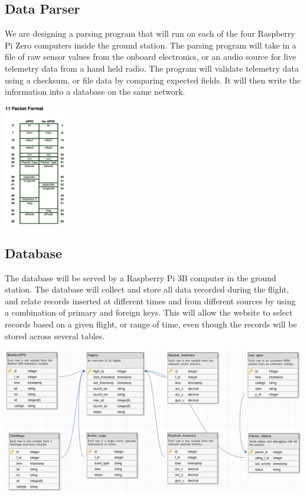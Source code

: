 \documentclass[onecolumn, draftclsnofoot, 10pt, compsoc]{IEEEtran}
\begin{document}
\subsection{Data Parser}
We are designing a parsing program that will run on each of the four Raspberry Pi Zero computers inside the ground station.  The parsing program will take in a file of raw sensor values from the onboard electronics, or an audio source for live telemetry data from a hand held radio.  The program will validate telemetry data using a checksum, or file data by comparing expected fields.  It will then write the information into a database on the same network.

\begin{center}
	\includegraphics[width=0.2\textwidth]{images/beelinegps-packet-format.eps}
    \label{parser-diagram}
\end{center}

\subsection{Database}
The database will be served by a Raspberry Pi 3B computer in the ground station.  The database will collect and store all data recorded during the flight, and relate records inserted at different times and from different sources by using a combination of primary and foreign keys. This will allow the website to select records based on a given flight, or range of time, even though the records will be stored across several tables.

\begin{center}
	\includegraphics[width=\textwidth]{images/database_schema_v102.eps}
    \label{database-schema}
\end{center}
\end{document}
